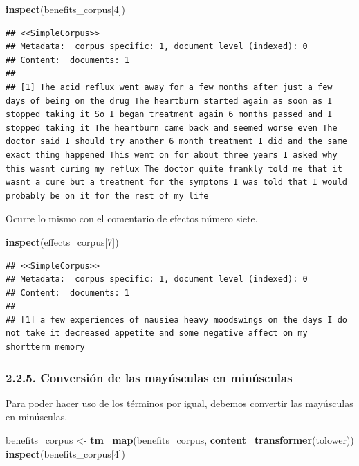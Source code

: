 \documentclass[spanish,]{article}
\newenvironment{Shaded}{\begin{snugshade}}{\end{snugshade}}
\newcommand{\DecValTok}[1]{\textcolor[rgb]{0.00,0.00,0.81}{#1}}
\newcommand{\KeywordTok}[1]{\textcolor[rgb]{0.13,0.29,0.53}{\textbf{#1}}}
\newcommand{\NormalTok}[1]{#1}
\newcommand{\StringTok}[1]{\textcolor[rgb]{0.31,0.60,0.02}{#1}}
\begin{document}
\begin{Shaded}
\begin{Highlighting}[]
\KeywordTok{inspect}\NormalTok{(benefits_corpus[}\DecValTok{4}\NormalTok{])}
\end{Highlighting}
\end{Shaded}

\begin{verbatim}
## <<SimpleCorpus>>
## Metadata:  corpus specific: 1, document level (indexed): 0
## Content:  documents: 1
## 
## [1] The acid reflux went away for a few months after just a few days of being on the drug The heartburn started again as soon as I stopped taking it So I began treatment again 6 months passed and I stopped taking it The heartburn came back and seemed worse even The doctor said I should try another 6 month treatment I did and the same exact thing happened This went on for about three years I asked why this wasnt curing my reflux The doctor quite frankly told me that it wasnt a cure but a treatment for the symptoms I was told that I would probably be on it for the rest of my life
\end{verbatim}

Ocurre lo mismo con el comentario de efectos número siete.

\begin{Shaded}
\begin{Highlighting}[]
\KeywordTok{inspect}\NormalTok{(effects_corpus[}\DecValTok{7}\NormalTok{])}
\end{Highlighting}
\end{Shaded}

\begin{verbatim}
## <<SimpleCorpus>>
## Metadata:  corpus specific: 1, document level (indexed): 0
## Content:  documents: 1
## 
## [1] a few experiences of nausiea heavy moodswings on the days I do not take it decreased appetite and some negative affect on my shortterm memory
\end{verbatim}

\hypertarget{conversion-de-las-mayusculas-en-minusculas}{%
\subsubsection{2.2.5. Conversión de las mayúsculas en
minúsculas}\label{conversion-de-las-mayusculas-en-minusculas}}

Para poder hacer uso de los términos por igual, debemos convertir las
mayúsculas en minúsculas.

\begin{Shaded}
\begin{Highlighting}[]
\NormalTok{benefits_corpus <-}\StringTok{ }\KeywordTok{tm_map}\NormalTok{(benefits_corpus, }\KeywordTok{content_transformer}\NormalTok{(tolower))}
\KeywordTok{inspect}\NormalTok{(benefits_corpus[}\DecValTok{4}\NormalTok{])}
\end{Highlighting}
\end{Shaded}
\end{document}
